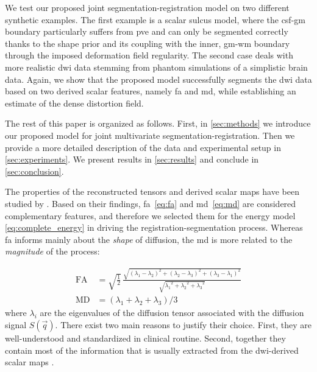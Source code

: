 We test our proposed joint segmentation-registration model on two different
synthetic examples.
The first example is a scalar sulcus model, where the
\gls{csf}-\gls{gm} boundary particularly suffers from \gls{pve} and can only be
segmented correctly thanks to the shape prior and its coupling with the inner,
\gls{gm}-\gls{wm} boundary through the imposed deformation field regularity.
The second case deals with more realistic \gls{dwi} data stemming from
phantom simulations of a simplistic brain data.
Again, we show that the
proposed model successfully segments the \gls{dwi} data based on two derived
scalar features, namely \gls{fa} and \gls{md}, while establishing an estimate
of the dense distortion field.

The rest of this paper is organized as follows.
First, in \autoref{sec:methods}
we introduce our proposed model for joint multivariate segmentation-registration.
Then we provide a more detailed description of the data and experimental setup in
\autoref{sec:experiments}.
We present results in \autoref{sec:results} and conclude
in \autoref{sec:conclusion}.


The properties of the reconstructed tensors and derived scalar maps have
been studied by \cite{ennis_orthogonal_2006}. Based on their
findings, \gls{fa}~\eqref{eq:fa} and \gls{md}~\eqref{eq:md} are
considered complementary features, and therefore we selected them for the
energy model \eqref{eq:complete_energy} in driving the
registration-segmentation process.
Whereas \gls{fa} informs mainly about the \emph{shape} of diffusion,
the \gls{md} is more related to the \emph{magnitude} of the process:

\begin{align}
\mathrm{FA} &= \sqrt{ \frac{1}{2}}\,\frac{\sqrt{ (\lambda_1 - \lambda_2)^2 + (\lambda_2 - \lambda_3)^2 + (\lambda_3 - \lambda_1)^2}}{\sqrt{ {\lambda_1}^2 + {\lambda_2}^2 + {\lambda_3}^2}} \label{eq:fa} \\
\mathrm{MD} &= ( \lambda_1 + \lambda_2 + \lambda_3 ) / 3 \label{eq:md}
\end{align}
where $\lambda_i$ are the eigenvalues of the diffusion tensor
associated with the diffusion signal $S(\vec{q})$. There exist
two main reasons to justify their choice.
First, they are well-understood and standardized in clinical routine.
Second, together they contain most of the information that is
usually extracted from the \gls{dwi}-derived scalar maps
\cite{ennis_orthogonal_2006}.
